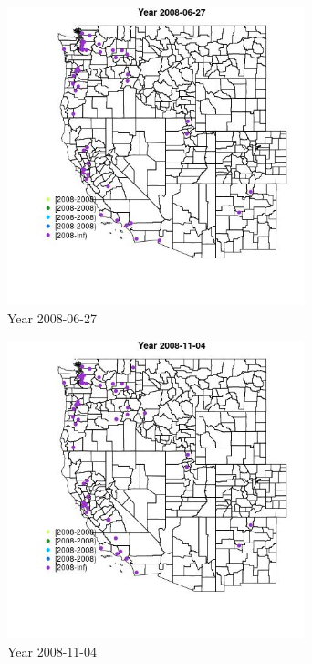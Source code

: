 \begin{figure} 
\centering  
\includegraphics[width=0.77\textwidth]{Code_Outputs/Report_ML_input_PM25_Step4_part_e_de_duplicated_aves_MapObsYear2008-06-27.jpg} 
\caption{\label{fig:Report_ML_input_PM25_Step4_part_e_de_duplicated_avesMapObsYear2008-06-27}Year 2008-06-27} 
\end{figure} 
 

\begin{figure} 
\centering  
\includegraphics[width=0.77\textwidth]{Code_Outputs/Report_ML_input_PM25_Step4_part_e_de_duplicated_aves_MapObsYear2008-11-04.jpg} 
\caption{\label{fig:Report_ML_input_PM25_Step4_part_e_de_duplicated_avesMapObsYear2008-11-04}Year 2008-11-04} 
\end{figure} 
 

